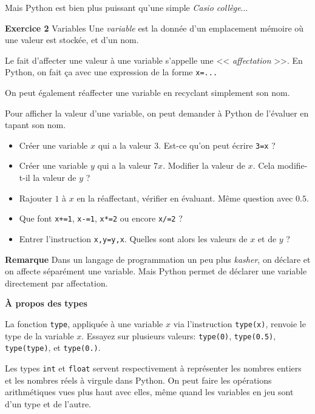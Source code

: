 \documentclass[10pt]{beamer}
\begin{document}
\begin{frame}[fragile]

Mais Python est bien plus puissant qu'une simple \textit{Casio collège}...
\pause
	\begin{block}{\textbf{Exercice 2} Variables}
		Une \textit{variable} est la donnée d'un emplacement mémoire où une valeur est stockée, et d'un nom.
		\pause
		
		Le fait d'affecter une valeur à une variable s'appelle une << \textit{affectation} >>. En Python, on fait ça avec une expression de la forme \verb|x=...|	
		\pause
		
		On peut également réaffecter une variable en recyclant simplement son nom.
		\pause
		
		Pour afficher la valeur d'une variable, on peut demander à Python de l'évaluer en tapant son nom.
		\pause
		
		\begin{itemize}[<+->]
		\item Créer une variable $x$ qui a la valeur $3$. Est-ce qu'on peut écrire \verb|3=x| ?
		
		\item Créer une variable $y$ qui a la valeur $7x$. Modifier la valeur de $x$. Cela modifie-t-il la valeur de $y$ ?
		
		\item Rajouter $1$ à $x$ en la réaffectant, vérifier en évaluant. Même question avec $0.5$.
		
		\item Que font \verb|x+=1|, \verb|x-=1|, \verb|x*=2| ou encore \verb|x/=2| ?
		
		\item Entrer l'instruction \verb|x,y=y,x|. Quelles sont alors les valeurs de $x$ et de $y$ ?
		\end{itemize}
		\pause[8]
	\end{block}
\end{frame}

\begin{frame}[fragile]
	\textbf{Remarque} Dans un langage de programmation un peu plus \textit{kasher}, on déclare et on affecte séparément une variable. Mais Python permet de déclarer une variable directement par affectation.
	\pause
	
	\vspace{1em}
	\textbf{À propos des types}
	
	La fonction \verb|type|, appliquée à une variable $x$ via l'instruction \verb|type(x)|, renvoie le type de la variable $x$. Essayez sur plusieurs valeurs: \verb|type(0)|, \verb|type(0.5)|, \verb|type(type)|, et \verb|type(0.)|.
	\pause
	
	Les types \verb|int| et \verb|float| servent respectivement à représenter les nombres entiers et les nombres réels à virgule dans Python. On peut faire les opérations arithmétiques vues plus haut avec elles, même quand les variables en jeu sont d'un type et de l'autre.
	
\end{frame}
\end{document}
